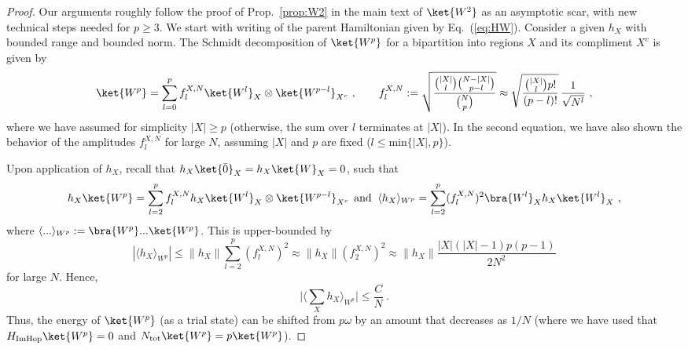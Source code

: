 \documentclass[prx,letterpaper,aps,superscriptaddress,floatfix,twocolumn,nofootinbib]{revtex4-2}
\theoremstyle{definition}
\newcommand{\defn}{:=}
\begin{document}
\begin{proof}
    Our arguments roughly follow the proof of Prop.~\ref{prop:W2} in the main text of $\ket{W^2}$ as an asymptotic scar, with new technical steps needed for $p \geq 3$.
    We start with writing of the parent Hamiltonian given by Eq.~(\ref{eq:HW}).
    Consider a given $h_X$ with bounded range and bounded norm.
    The Schmidt decomposition of $\ket{W^p}$ for a bipartition into regions $X$ and its compliment $X^c$ is given by
    \begin{equation}
        \ket{W^p} = \sum_{l=0}^{p}  f_{l}^{X,N} \ket{W^l}_X\otimes \ket{W^{p-l}}_{X^c} ~, \qquad
        f_{l}^{X,N} \defn \sqrt{\frac{\binom{|X|}{l}\binom{N-|X|}{p-l}}{\binom{N}{p}}} \approx \sqrt{\frac{\binom{|X|}{l} p!}{(p-l)!}}\, \frac{1}{\sqrt{N^l}} ~,
        \label{eq:flapprox}
    \end{equation}
    where we have assumed for simplicity $|X| \geq p$ (otherwise, the sum over $l$ terminates at $|X|$).
    In the second equation, we have also shown the behavior of the amplitudes $f_{l}^{X,N}$ for large $N$, assuming $|X|$ and $p$ are fixed ($l \leq \text{min}\{|X|,p\}$).

    Upon application of $h_X$, recall that $h_X\ket{\bar{0}}_X=h_X\ket{W}_X=0$, such that
    \begin{equation}
    h_X \ket{W^p} = \sum_{l=2}^{p} f_{l}^{X,N} h_X \ket{W^l}_X\otimes \ket{W^{p-l}}_{X^c}\,\;\text{and}\;\;\langle h_X \rangle_{W^p} = \sum_{l=2}^p (f_{l}^{X,N})^2 \bra{W^l}_X h_X \ket{W^l}_X ~,
    \label{eq:hXWp}
    \end{equation}
    where $\langle...\rangle_{W^p}:=\bra{W^p}...\ket{W^p}$.
    This is upper-bounded by
    \begin{equation}
    |\langle h_X \rangle_{W^p}| \leq \|h_X\| \sum_{l=2}^p (f_{l}^{X,N})^2 \approx \|h_X\| (f_{2}^{X,N})^2
    \approx \|h_X\| \frac{|X|(|X|-1) p(p-1)}{2 N^2}
    \end{equation}
    for large $N$.
    Hence,
    \begin{equation}
    \big|\big\langle \sum_X h_X \big\rangle_{W^p}\big| \leq \frac{C}{N} ~.
    \label{eq:h_XWpexp}
    \end{equation}
    Thus, the energy of $\ket{W^p}$ (as a trial state) can be shifted from $p \omega$ by an amount that decreases as $1/N$ (where we have used that $H_{\text{ImHop}} \ket{W^p} = 0$ and $N_{\text{tot}} \ket{W^p} = p \ket{W^p}$).


\end{proof}
\end{document}
